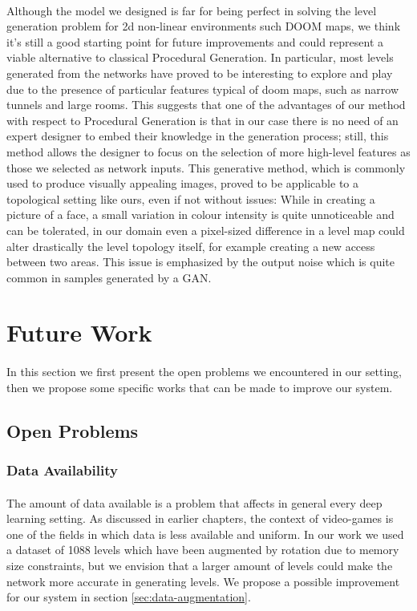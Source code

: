 \paragraph{} Although the model we designed is far for being perfect in solving the level generation problem for 2d non-linear environments such DOOM maps, we think it's still a good starting point for future improvements and could represent a viable alternative to classical Procedural Generation. In particular, most levels generated from the networks have proved to be interesting to explore and play due to the presence of particular features typical of doom maps, such as narrow tunnels and large rooms. This suggests that one of the advantages of our method with respect to Procedural Generation is that in our case there is no need of an expert designer to embed their knowledge in the generation process; still, this method allows the designer to focus on the selection of more high-level features as those we selected as network inputs. This generative method, which is commonly used to produce visually appealing images, proved to be applicable to a topological setting like ours, even if not without issues: While in creating a picture of a face, a small variation in colour intensity is quite unnoticeable and can be tolerated, in our domain even a pixel-sized difference in a level map could alter drastically the level topology itself, for example creating a new access between two areas. This issue is emphasized by the output noise which is quite common in samples generated by a GAN.

\clearpage

\section{Future Work}
\label{sec:futurework}
\paragraph{} In this section we first present the open problems we encountered in our setting, then we propose some specific works that can be made to improve our system.
\subsection{Open Problems}
\subsubsection{Data Availability}
\paragraph{} The amount of data available is a problem that affects in general every deep learning setting. As discussed in earlier chapters, the context of video-games is one of the fields in which data is less available and uniform. In our work we used a dataset of 1088 levels which have been augmented by rotation due to memory size constraints, but we envision that a larger amount of levels could make the network more accurate in generating levels. We propose a possible improvement for our system in section \ref{sec:data-augmentation}.
